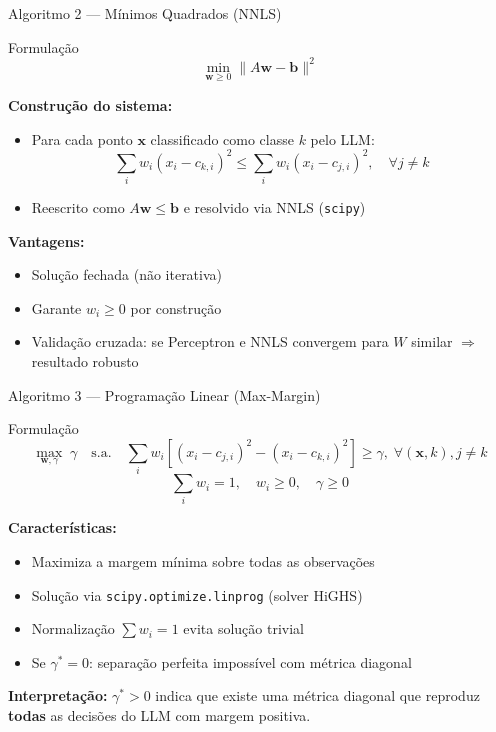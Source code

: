 \documentclass[aspectratio=169,12pt]{beamer}
\begin{document}
\begin{frame}{Algoritmo 2 --- Mínimos Quadrados (NNLS)}
\small
\begin{block}{Formulação}
\[
\min_{\mathbf{w} \geq 0} \| A\mathbf{w} - \mathbf{b} \|^2
\]
\end{block}

\textbf{Construção do sistema:}
\begin{itemize}
    \item Para cada ponto $\mathbf{x}$ classificado como classe $k$ pelo LLM:
    \[
    \sum_i w_i (x_i - c_{k,i})^2 \leq \sum_i w_i (x_i - c_{j,i})^2, \quad \forall j \neq k
    \]
    \item Reescrito como $A\mathbf{w} \leq \mathbf{b}$ e resolvido via NNLS (\texttt{scipy})
\end{itemize}

\textbf{Vantagens:}
\begin{itemize}
    \item Solução fechada (não iterativa)
    \item Garante $w_i \geq 0$ por construção
    \item Validação cruzada: se Perceptron e NNLS convergem para $W$ similar $\Rightarrow$ resultado robusto
\end{itemize}
\end{frame}

\begin{frame}{Algoritmo 3 --- Programação Linear (Max-Margin)}
\small
\begin{block}{Formulação}
\[
\max_{\mathbf{w}, \gamma} \; \gamma \quad \text{s.a.} \quad
\sum_i w_i \left[(x_i - c_{j,i})^2 - (x_i - c_{k,i})^2\right] \geq \gamma, \; \forall (\mathbf{x}, k), j \neq k
\]
\[
\sum_i w_i = 1, \quad w_i \geq 0, \quad \gamma \geq 0
\]
\end{block}

\textbf{Características:}
\begin{itemize}
    \item Maximiza a margem mínima sobre todas as observações
    \item Solução via \texttt{scipy.optimize.linprog} (solver HiGHS)
    \item Normalização $\sum w_i = 1$ evita solução trivial
    \item Se $\gamma^* = 0$: separação perfeita impossível com métrica diagonal
\end{itemize}

\textbf{Interpretação:} $\gamma^* > 0$ indica que existe uma métrica diagonal que reproduz \textbf{todas} as decisões do LLM com margem positiva.
\end{frame}
\end{document}
